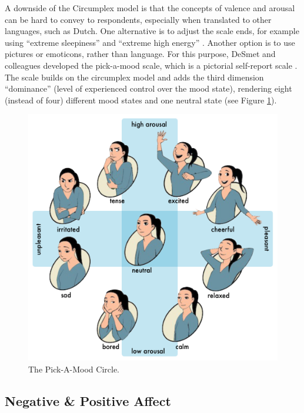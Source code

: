 \documentclass[]{book}
\begin{document}
A downside of the Circumplex model is that the concepts of valence and
arousal can be hard to convey to respondents, especially when translated
to other languages, such as Dutch. One alternative is to adjust the
scale ends, for example using ``extreme sleepiness'' and ``extreme high
energy'' \citep{sharar2016}. Another option is to use pictures or
emoticons, rather than language. For this purpose, DeSmet and colleagues
developed the pick-a-mood scale, which is a pictorial self-report scale
\citep{Desmet2016}. The scale builds on the circumplex model and adds
the third dimension ``dominance'' (level of experienced control over the
mood state), rendering eight (instead of four) different mood states and
one neutral state (see Figure \ref{fig:pickamood}).

\begin{figure}

{\centering \includegraphics[width=0.5\linewidth]{images/outcomes/Circumplex-Pick-A-Mood} 

}

\caption{The Pick-A-Mood Circle.}\label{fig:pickamood}
\end{figure}

\subsection{Negative \& Positive Affect}\label{negative-positive-affect}

 
\end{document}
